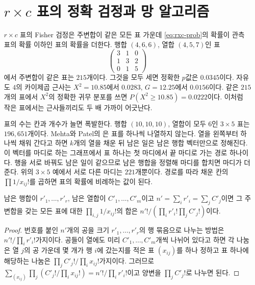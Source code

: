 \section{\texorpdfstring{$r\times c$}{r x c} 표의 정확 검정과 망 알고리즘}
\label{sec:network}

$r\times c$ 표의 Fisher 검정은 주변합이 같은 모든 표 가운데 \eqref{eq:rxc-prob}의 확률이 관측 표의 확률 이하인 표의 확률을 더한다. 행합 $(4,6,6)$, 열합 $(4,5,7)$인 표
\[
\begin{pmatrix}3&1&0\\1&3&2\\0&1&5\end{pmatrix}
\]
에서 주변합이 같은 표는 $215$개이다. 그것을 모두 세면 정확한 $p$값은 $0.0345$이다. 자유도 $4$의 카이제곱 근사는 $X^2=10.85$에서 $0.0283$, $G=12.25$에서 $0.0156$이다. 같은 $215$개의 표에서 $X^2$의 정확한 귀무 분포를 쓰면 $P(X^2\ge10.85)=0.0222$이다. 이처럼 작은 표에서는 근사들끼리도 두 배 가까이 어긋난다.

표의 수는 칸과 개수가 늘면 폭발한다. 행합 $(10,10,10)$, 열합이 모두 $6$인 $3\times5$ 표는 $196{,}651$개이다. Mehta와 Patel의 은 표를 하나씩 나열하지 않는다\cite{mehta1983}. 열을 왼쪽부터 하나씩 채워 간다고 하면 $k$개의 열을 채운 뒤 남은 일은 남은 행합 벡터만으로 정해진다. 이 벡터를 마디로 하는 그래프에서 표 하나는 첫 마디에서 끝 마디로 가는 경로 하나이다. 행을 서로 바꿔도 남은 일이 같으므로 남은 행합을 정렬해 마디를 합치면 마디가 더 준다. 위의 $3\times5$ 예에서 서로 다른 마디는 $221$개뿐이다. 경로를 따라 채운 칸의 $\prod1/x_{ij}!$를 곱하면 표의 확률에 비례하는 값이 된다.

\begin{lemma}
\label{lem:completion-sum}
남은 행합이 $r'_1,\dots,r'_r$, 남은 열합이 $C'_1,\dots,C'_m$이고 $n'=\sum_ir'_i=\sum_jC'_j$이면 그 주변합을 갖는 모든 표에 대한 $\prod_{i,j}1/x_{ij}!$의 합은 $n'!/(\prod_ir'_i!\prod_jC'_j!)$이다.
\end{lemma}

\begin{proof}
번호를 붙인 $n'$개의 공을 크기 $r'_1,\dots,r'_r$의 행 묶음으로 나누는 방법은 $n'!/\prod_ir'_i!$가지이다. 공들이 열에도 미리 $C'_1,\dots,C'_m$개씩 나뉘어 있다고 하면 각 나눔은 열 $j$의 공 가운데 몇 개가 행 $i$에 갔는지를 적은 표 $(x_{ij})$를 하나 정하고 표 하나에 해당하는 나눔은 $\prod_jC'_j!/\prod_ix_{ij}!$가지이다. 그러므로 $\sum_{(x_{ij})}\prod_j(C'_j!/\prod_ix_{ij}!)=n'!/\prod_ir'_i!$이고 양변을 $\prod_jC'_j!$로 나누면 된다.
\end{proof}

